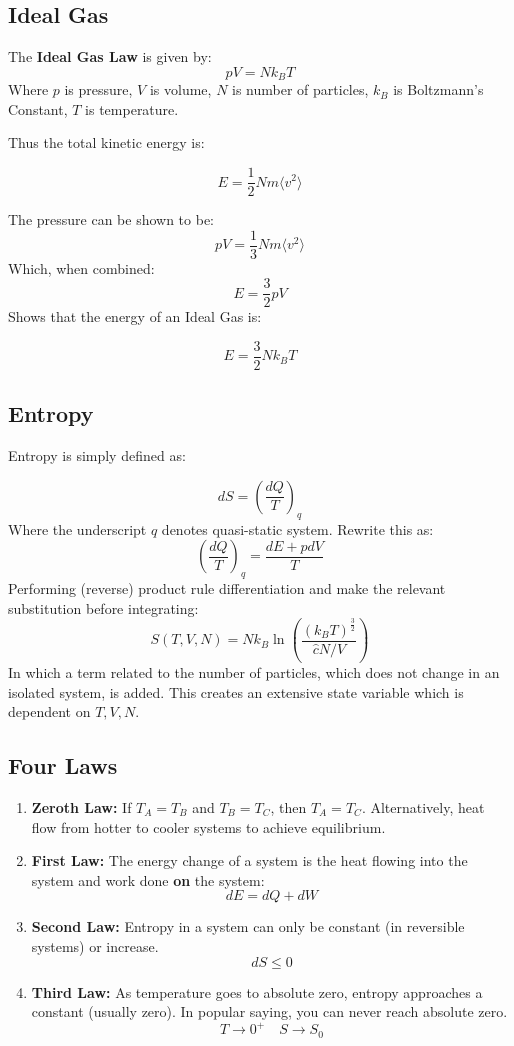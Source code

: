 \documentclass[12pt]{article}
\begin{document}
\subsection{Ideal Gas}

The \textbf{Ideal Gas Law} is given by:
\[\boxed{pV = Nk_B T}\]
Where $p$ is pressure, $V$ is volume, $N$ is number of particles, $k_B$ is Boltzmann's Constant, $T$ is temperature.

Thus the total kinetic energy is:

\[ E = \frac12 N m \langle v^2 \rangle\]

The pressure can be shown to be:
\[ pV =\frac13 Nm\langle v^2\rangle\]
Which, when combined:
\[E = \frac32pV\]
Shows that the energy of an Ideal Gas is:

\[ E = \frac32 Nk_B T\]

\subsection{Entropy}
Entropy is simply defined as:

\[ dS = \left(\frac{dQ}{T}\right)_q  \]
Where the underscript $q$ denotes quasi-static system. Rewrite this as:
\[\left(\frac{dQ}{T}\right)_q = \frac{dE + pdV}{T}\]
Performing (reverse) product rule differentiation and make the relevant substitution before integrating:
\[ S(T,V, N) = N k_B\ln{\left(\frac{(k_B T)^\frac32}{\hat{c}N/V}\right)}\]
In which a term related to the number of particles, which does not change in an isolated system, is added. This creates an extensive state variable which is dependent on $T,V,N$.  



\subsection{Four Laws}

\begin{enumerate}
    \item \textbf{Zeroth Law:} If $T_A = T_B$ and $T_B = T_C$, then $T_A =T_C$. Alternatively, heat flow from hotter to cooler systems to achieve equilibrium.
    \item \textbf{First Law:} The energy change of a system is the heat flowing into the system and work done \textbf{on} the system: \[dE = dQ + dW\]
    \item \textbf{Second Law:} Entropy in a system can only be constant (in reversible systems) or increase. \[dS \leq 0\]
    \item \textbf{Third Law:} As temperature goes to absolute zero, entropy approaches a constant (usually zero). In popular saying, you can never reach absolute zero. \[T \to 0^+ \quad S\to S_0\]
\end{enumerate}
\end{document}
